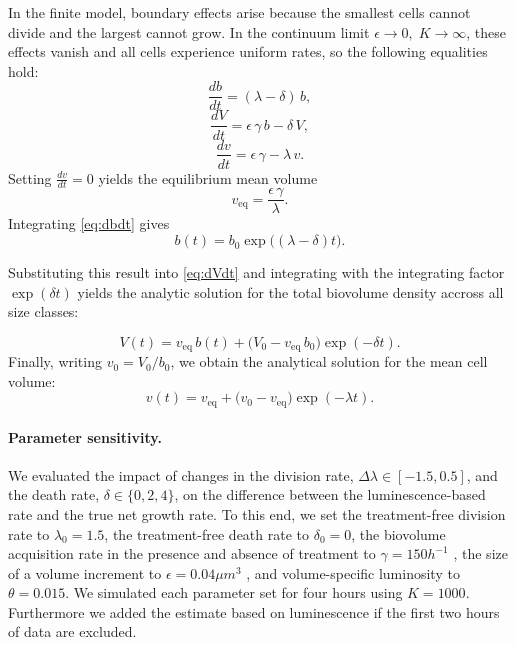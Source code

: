 In the finite model, boundary effects arise because the smallest cells cannot divide and the largest cannot grow.
In the continuum limit \(\epsilon \to 0,\; K \to \infty\), these effects vanish and all cells experience uniform rates, so the following equalities hold:
\begin{equation}
  \frac{db}{dt}=(\lambda-\delta)\,b,\label{eq:dbdt}
\end{equation}
\begin{equation}
  \frac{dV}{dt}=\epsilon\,\gamma\,b-\delta\,V,\label{eq:dVdt}
\end{equation}
\begin{equation}
  \frac{dv}{dt}=\epsilon\,\gamma-\lambda\,v.\label{eq:dvdt}
\end{equation}
Setting \(\tfrac{dv}{dt}=0\) yields the equilibrium mean volume
\begin{equation}
  v_{\mathrm{eq}}=\frac{\epsilon\,\gamma}{\lambda}.
\end{equation}
Integrating \autoref{eq:dbdt} gives
\begin{equation}
  \label{eq:b_sol}
  b(t)=b_0\exp\bigl((\lambda-\delta)t\bigr).
\end{equation}

Substituting this result into \autoref{eq:dVdt} and integrating with the integrating factor \(\exp(\delta t)\) yields the analytic solution for the total biovolume density accross all size classes:

\begin{equation}
  \label{eq:V_sol}
  V(t)=v_{\mathrm{eq}}\,b(t)+\bigl(V_0-v_{\mathrm{eq}}\,b_0\bigr)\exp(-\delta t).
\end{equation}
Finally, writing \(v_0 = V_0 / b_0\), we obtain the analytical solution for the mean cell volume:
\begin{equation}
  \label{eq:v_sol}
  v(t)=v_{\mathrm{eq}}+\bigl(v_0-v_{\mathrm{eq}}\bigr)\exp(-\lambda t).
\end{equation}

\paragraph{Parameter sensitivity.}
We evaluated the impact of changes in the division rate, $\Delta \lambda \in [-1.5, 0.5]$, and the death rate, $\delta \in \{0, 2, 4\}$, on the difference between the luminescence-based rate and the true net growth rate.
To this end, we set the treatment-free division rate to $\lambda_0 = 1.5$, the treatment-free death rate to $\delta_0 = 0$, the biovolume acquisition rate in the presence and absence of treatment to $\gamma = 150 h^{-1}$ , the size of a volume increment to $\epsilon = 0.04 \mu m^3$ , and volume-specific luminosity to $\theta = 0.015$.
We simulated each parameter set for four hours using $K = 1000$. Furthermore we added the estimate based on luminescence if the first two hours of data are excluded.


